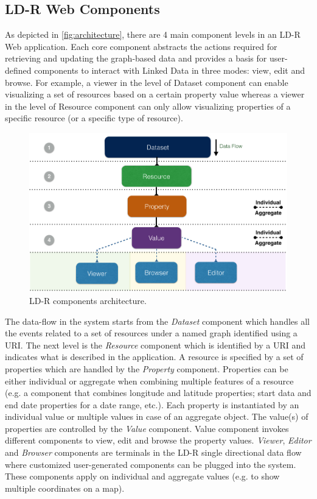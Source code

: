 \documentclass{acm_proc_article-sp}
\begin{document}
\subsection{LD-R Web Components}
As depicted in \autoref{fig:architecture}, there are 4 main component levels in an LD-R Web application.
Each core component abstracts the actions required for retrieving and updating the graph-based data and provides a basis for user-defined components to interact with Linked Data in three modes: view, edit and browse.
For example, a viewer in the level of Dataset component can enable visualizing a set of resources based on a certain property value whereas a viewer in the level of Resource component can only allow visualizing properties of a specific resource (or a specific type of resource).

\begin{figure}[tb]
  \includegraphics[width=1\linewidth]{images/architecture.jpg}
  \caption{LD-R components architecture.}
  \label{fig:architecture}
\end{figure}

The data-flow in the system starts from the \emph{Dataset} component which handles all the events related to a set of resources under a named graph identified using a URI.
The next level is the \emph{Resource} component which is identified by a URI and indicates what is described in the application.
A resource is specified by a set of properties which are handled by the \emph{Property} component. 
Properties can be either individual or aggregate when combining multiple features of a resource (e.g. a component that combines longitude and latitude properties; start data and end date properties for a date range, etc.).
Each property is instantiated by an individual value or multiple values in case of an aggregate object. 
The value(s) of properties are controlled by the \emph{Value} component.
Value component invokes different components to view, edit and browse the property values.
\emph{Viewer}, \emph{Editor} and \emph{Browser} components are terminals in the LD-R single directional data flow where customized user-generated components can be plugged into the system.
These components apply on individual and aggregate values (e.g. to show multiple coordinates on a map).
\end{document}
